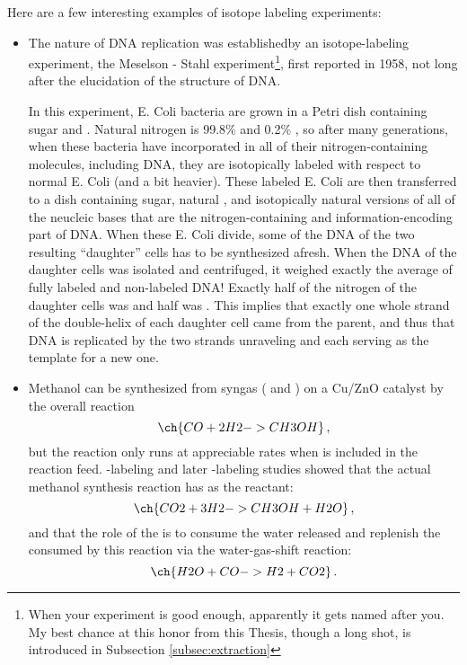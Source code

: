 Here are a few interesting examples of isotope labeling experiments:
\begin{itemize}
	\item The nature of DNA replication was establishedby an isotope-labeling experiment, the Meselson - Stahl experiment\footnote{When your experiment is good enough, apparently it gets named after you. My best chance at this honor from this Thesis, though a long shot, is introduced in Subsection \ref{subsec:extraction}}, first reported in 1958, not long after the elucidation of the structure of DNA\cite{Meselson1958}. 
	
	In this experiment, E. Coli bacteria are grown in a Petri dish containing sugar and . Natural nitrogen is 99.8\%  and 0.2\% , so after many generations, when these bacteria have incorporated  in all of their nitrogen-containing molecules, including DNA, they are isotopically labeled with respect to normal E. Coli (and a bit heavier). These labeled E. Coli are then transferred to a dish containing sugar, natural , and isotopically natural versions of all of the neucleic bases that are the nitrogen-containing and information-encoding part of DNA. When these E. Coli divide, some of the DNA of the two resulting ``daughter'' cells has to be synthesized afresh. When the DNA of the daughter cells was isolated and centrifuged, it weighed exactly the average of fully labeled and non-labeled DNA! Exactly half of the nitrogen of the daughter cells was  and half was . This implies that exactly one whole strand of the double-helix of each daughter cell came from the parent, and thus that DNA is replicated by the two strands unraveling and each serving as the template for a new one.
	
	\item 
	Methanol can be synthesized from syngas ( and ) on a Cu/ZnO catalyst\cite{Concepts2003} by the overall reaction
	\begin{equation}
	\ch{CO + 2 H2 -> CH3OH}\,,
	\end{equation} 
	but the reaction only runs at appreciable rates when  is included in the reaction feed. -labeling\cite{Chinchen1987} and later -labeling studies\cite{Studt2015} showed that the actual methanol synthesis reaction has  as the reactant:
	\begin{equation}
	\ch{CO2 + 3 H2 -> CH3OH + H2O}\,,
	\end{equation}
	and that the role of the  is to consume the water released and replenish the  consumed by this reaction via the water-gas-shift reaction:
	\begin{equation}
	\ch{H2O + CO -> H2 + CO2}\,.
	\end{equation}
	

\end{itemize}

